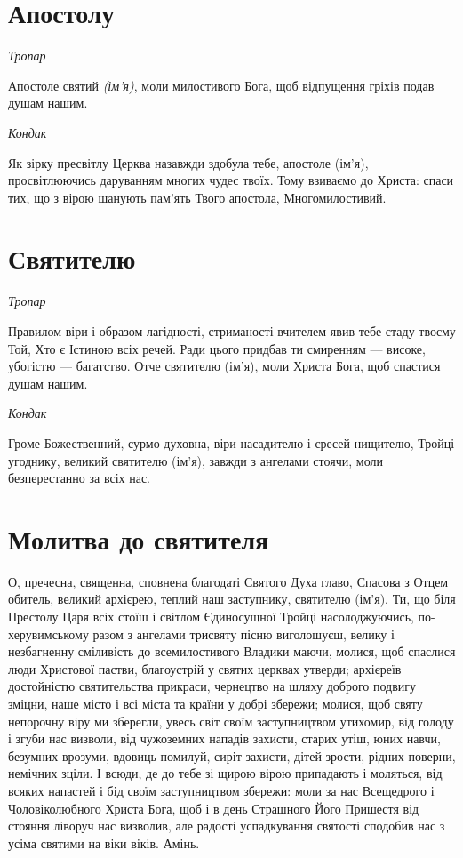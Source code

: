 \documentclass[chapters.tex]{subfiles}
\begin{document}
\section{Апостолу}
\emph{Тропар}

Апостоле святий \emph{(ім’я)}, моли милостивого Бога, щоб відпущення гріхів подав душам нашим.

\emph{Кондак}

Як зірку пресвітлу Церква назавжди здобула тебе, апостоле (ім’я), просвітлюючись даруванням многих чудес твоїх. Тому взиваємо до Христа: спаси тих, що з вірою шанують пам’ять Твого апостола, Многомилостивий.

\section{Святителю}
\emph{Тропар}

Правилом віри і образом лагідності, стриманості вчителем явив тебе стаду твоєму Той, Хто є Істиною всіх речей. Ради цього придбав ти смиренням — високе, убогістю — багатство. Отче святителю (ім’я), моли Христа Бога, щоб спастися душам нашим.

\emph{Кондак}

Громе Божественний, сурмо духовна, віри насадителю і єресей нищителю, Тройці угоднику, великий святителю (ім’я), завжди з ангелами стоячи, моли безперестанно за всіх нас.

\section{Молитва до святителя}
О, пречесна, священна, сповнена благодаті Святого Духа главо, Спасова з Отцем обитель, великий архієрею, теплий наш заступнику, святителю (ім’я). Ти, що біля Престолу Царя всіх стоїш і світлом Єдиносущної Тройці насолоджуючись, по-херувимському разом з ангелами трисвяту пісню виголошуєш, велику і незбагненну сміливість до всемилостивого Владики маючи, молися, щоб спаслися люди Христової пастви, благоустрій у святих церквах утверди; архієреїв достойністю святительства прикраси, чернецтво на шляху доброго подвигу зміцни, наше місто і всі міста та країни у добрі збережи; молися, щоб святу непорочну віру ми зберегли, увесь світ своїм заступництвом утихомир, від голоду і згуби нас визволи, від чужоземних нападів захисти, старих утіш, юних навчи, безумних врозуми, вдовиць помилуй, сиріт захисти, дітей зрости, рідних поверни, немічних зціли. І всюди, де до тебе зі щирою вірою припадають і моляться, від всяких напастей і бід своїм заступництвом збережи: моли за нас Всещедрого і Чоловіколюбного Христа Бога, щоб і в день Страшного Його Пришестя від стояння ліворуч нас визволив, але радості успадкування святості сподобив нас з усіма святими на віки віків. Амінь.
\end{document}
